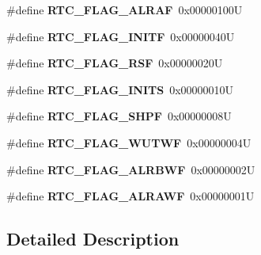 \begin{DoxyCompactItemize}
\item 
\mbox{\label{group___r_t_c___flags___definitions_gaf9e1a4b5eedd674d7b35ae334877ba12}} 
\#define {\bfseries R\+T\+C\+\_\+\+F\+L\+A\+G\+\_\+\+A\+L\+R\+AF}~0x00000100U
\item 
\mbox{\label{group___r_t_c___flags___definitions_ga8d973d7f6b07e80743e05d6822ff2147}} 
\#define {\bfseries R\+T\+C\+\_\+\+F\+L\+A\+G\+\_\+\+I\+N\+I\+TF}~0x00000040U
\item 
\mbox{\label{group___r_t_c___flags___definitions_ga78c4245996bef8d5f39226b6e37ed9c0}} 
\#define {\bfseries R\+T\+C\+\_\+\+F\+L\+A\+G\+\_\+\+R\+SF}~0x00000020U
\item 
\mbox{\label{group___r_t_c___flags___definitions_gae6a2d26d4b10670f6506b14971f52fd2}} 
\#define {\bfseries R\+T\+C\+\_\+\+F\+L\+A\+G\+\_\+\+I\+N\+I\+TS}~0x00000010U
\item 
\mbox{\label{group___r_t_c___flags___definitions_ga8fd11878d6285ab5d35966d598d5e6f9}} 
\#define {\bfseries R\+T\+C\+\_\+\+F\+L\+A\+G\+\_\+\+S\+H\+PF}~0x00000008U
\item 
\mbox{\label{group___r_t_c___flags___definitions_ga24648116b32442d30da74c497e2e88ae}} 
\#define {\bfseries R\+T\+C\+\_\+\+F\+L\+A\+G\+\_\+\+W\+U\+T\+WF}~0x00000004U
\item 
\mbox{\label{group___r_t_c___flags___definitions_gae9dd4b5b8059937c3422bc1e3eae3ced}} 
\#define {\bfseries R\+T\+C\+\_\+\+F\+L\+A\+G\+\_\+\+A\+L\+R\+B\+WF}~0x00000002U
\item 
\mbox{\label{group___r_t_c___flags___definitions_gaf4913efa96d03ded991b1cdddd6b7823}} 
\#define {\bfseries R\+T\+C\+\_\+\+F\+L\+A\+G\+\_\+\+A\+L\+R\+A\+WF}~0x00000001U
\end{DoxyCompactItemize}


\subsection{Detailed Description}
